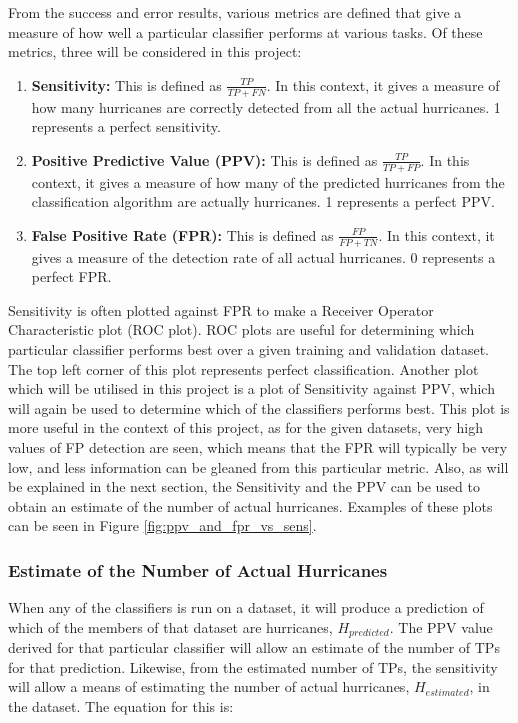 \documentclass[pdftex,12pt,a4paper]{report}
\begin{document}
From the success and error results, various metrics are defined that give a measure of how well a
particular classifier performs at various tasks. Of these metrics, three will be considered in this
project:

\begin{enumerate}
    \item \textbf{Sensitivity:} This is defined as $\frac{TP}{TP + FN}$. In this context, it gives a
        measure of how many hurricanes are correctly detected from all the actual hurricanes. 1
        represents a perfect sensitivity.
    \item \textbf{Positive Predictive Value (PPV):} This is defined as $\frac{TP}{TP + FP}$. In this
        context, it gives a measure of how many of the predicted hurricanes from the classification
        algorithm are actually hurricanes. 1 represents a perfect PPV.
    \item \textbf{False Positive Rate (FPR):} This is defined as $\frac{FP}{FP + TN}$. In this
        context, it gives a measure of the detection rate of all actual hurricanes. 0 represents a
        perfect FPR.
\end{enumerate}

Sensitivity is often plotted against FPR to make a Receiver Operator Characteristic plot (ROC plot).
ROC plots are useful for determining which particular classifier performs best over a given training
and validation dataset. The top left corner of this plot represents perfect classification.  Another
plot which will be utilised in this project is a plot of Sensitivity against PPV, which will again
be used to determine which of the classifiers performs best. This plot is more useful in the context
of this project, as for the given datasets, very high values of FP detection are seen, which means
that the FPR will typically be very low, and less information can be gleaned from this particular
metric. Also, as will be explained in the next section, the Sensitivity and the PPV can be used to
obtain an estimate of the number of actual hurricanes. Examples of these plots can be seen in
Figure \ref{fig:ppv_and_fpr_vs_sens}.

\subsubsection{Estimate of the Number of Actual Hurricanes}

When any of the classifiers is run on a dataset, it will produce a prediction of which of the
members of that dataset are hurricanes, $H_{predicted}$. The PPV value derived for that particular classifier will
allow an estimate of the number of TPs for that prediction. Likewise, from the estimated number of
TPs, the sensitivity will allow a means of estimating the number of actual hurricanes, $H_{estimated}$,
in the dataset. The equation for this is:
\end{document}
